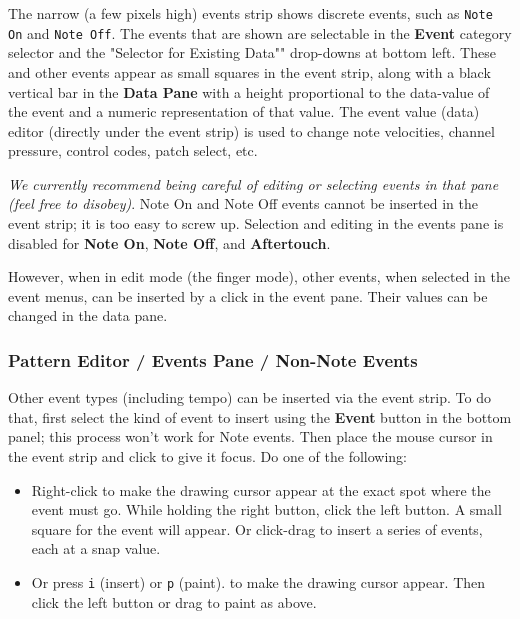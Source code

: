    The narrow (a few pixels high) events strip shows discrete events,
   such as \texttt{Note On} and \texttt{Note Off}.
   The events that are shown are selectable in the \textbf{Event} category
   selector and the "Selector for Existing Data"" drop-downs at bottom left.
   These and other events appear
   as small squares in the event strip, along with a black vertical bar
   in the \textbf{Data Pane} with a
   height proportional to the data-value of the event and a numeric
   representation of that value.
	The event value (data) editor (directly under the event strip) is used 
	to change note velocities, channel pressure, control codes,
	patch select, etc.

   \textsl{We currently recommend being careful of editing or selecting events
   in that pane (feel free to disobey)}.
   Note On and Note Off events cannot be inserted in the event strip;
   it is too easy to screw up.
   Selection and editing in the events pane is disabled for
   \textbf{Note On}, \textbf{Note Off}, and \textbf{Aftertouch}.
   
   However, when in edit mode (the finger mode), other events, when
   selected in the event menus, can be inserted
   by a click in the event pane.
   Their values can be changed in the data pane.
 
\subsubsection{Pattern Editor / Events Pane / Non-Note Events}
\label{subsubsec:pattern_editor_events_pane_non_note_events}

   Other event types (including tempo) can be inserted via the event strip.
   To do that, first select the kind of event to insert using the
   \textbf{Event} button in the bottom panel; this process won't work
   for Note events.
   Then place the mouse cursor in the event strip and click to give it
   focus.
   Do one of the following:

   \begin{itemize}
      \item Right-click to make the drawing cursor appear at
         the exact spot where the event must go.  While holding the right
         button, click the left button.
         A small square for the event will appear.
         Or click-drag to insert a
         series of events, each at a snap value.
      \item Or press \texttt{i} (insert) or \texttt{p} (paint).
         to make the drawing cursor appear.
         Then click the left button or drag to paint as above.
   \end{itemize}

